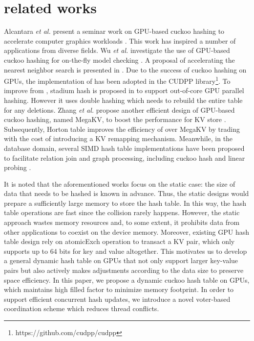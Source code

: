 \section{related works}\label{sec:rel}
Alcantara \textit{et al.} present a seminar work on GPU-based cuckoo hashing to accelerate computer graphics workloads \cite{alcantara2009real}. 
This work has inspired a number of applications from diverse fields. Wu \textit{et al.} investigate the use of GPU-based cuckoo hashing for
on-the-fly model checking \cite{wu2015gpu}. A proposal of accelerating the nearest neighbor search is presented in \cite{pan2010efficient}. 
Due to the success of cuckoo hashing on GPUs, the implementation of \cite{alcantara2009real} has been adopted in the CUDPP library\footnote{https://github.com/cudpp/cudpp}.
To improve from \cite{alcantara2009real}, stadium hash is proposed in \cite{khorasani2015stadium} to support out-of-core GPU parallel hashing. However it uses double hashing which needs to rebuild the entire table for any deletions.  
Zhang \textit{et al.} propose another efficient design of GPU-based cuckoo hashing, named MegaKV, 
to boost the performance for KV store \cite{zhang2015mega}. 
Subsequently, Horton table \cite{breslow2016horton} improves the efficiency of  over MegaKV by trading with the cost of introducing a KV remapping mechanism.
Meanwhile, in the database domain, several SIMD hash table implementations have been proposed to facilitate relation join and graph processing, including cuckoo hash \cite{ross2007efficient} and linear probing \cite{zhong2014medusa}. 

It is noted that the aforementioned works focus on the static case: the size of data that needs to be hashed is known in advance. Thus, the static designs would prepare a sufficiently large memory to store the hash table. In this way, the hash table operations are fast since the collision rarely happens. However, the static approach wastes memory resources and, to some extent, it prohibits data from other applications to coexist on the device memory. 
Moreover, existing GPU hash table design rely on atomicExch operation to transact a KV pair, which only supports up to 64 bits for key and value altogether.
This motivates us to develop a general dynamic hash table on GPUs that not only support larger key-value pairs but also actively makes adjustments according to the data size to preserve space efficiency. 
In this paper, we propose a dynamic cuckoo hash table on GPUs, which maintains high filled factor to minimize memory footprint. In order to support efficient concurrent hash updates, we introduce a novel voter-based coordination scheme which reduces thread conflicts. 

